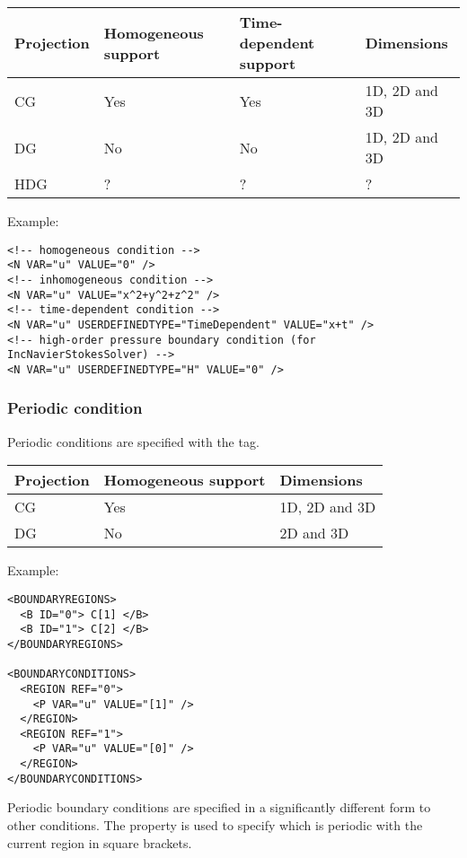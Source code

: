 \begin{tabular}{llll}
Projection & Homogeneous support & Time-dependent support & Dimensions \\
\toprule
CG & Yes & Yes & 1D, 2D and 3D \\
DG & No  & No  & 1D, 2D and 3D \\
HDG & ? & ? & ?
\end{tabular}

Example:
\begin{lstlisting}[style=XMLStyle]
<!-- homogeneous condition -->
<N VAR="u" VALUE="0" />
<!-- inhomogeneous condition -->
<N VAR="u" VALUE="x^2+y^2+z^2" />
<!-- time-dependent condition -->
<N VAR="u" USERDEFINEDTYPE="TimeDependent" VALUE="x+t" />
<!-- high-order pressure boundary condition (for IncNavierStokesSolver) -->
<N VAR="u" USERDEFINEDTYPE="H" VALUE="0" />
\end{lstlisting}

\subsubsection{Periodic condition}
Periodic conditions are specified with the  tag.

\begin{tabular}{lll}
Projection & Homogeneous support & Dimensions \\
\toprule
CG  & Yes & 1D, 2D and 3D \\
DG  & No  & 2D and 3D
\end{tabular}

Example:
\begin{lstlisting}[style=XMLStyle]
<BOUNDARYREGIONS>
  <B ID="0"> C[1] </B>
  <B ID="1"> C[2] </B>
</BOUNDARYREGIONS>

<BOUNDARYCONDITIONS>
  <REGION REF="0">
    <P VAR="u" VALUE="[1]" />
  </REGION>
  <REGION REF="1">
    <P VAR="u" VALUE="[0]" />
  </REGION>
</BOUNDARYCONDITIONS>
\end{lstlisting}

Periodic boundary conditions are specified in a significantly different form to
other conditions. The  property is used to specify which
 is periodic with the current region in square brackets.

